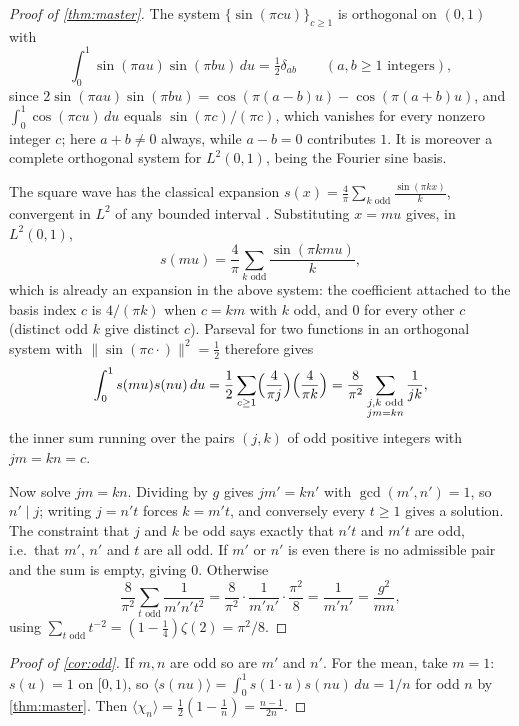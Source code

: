 \documentclass[11pt]{amsart}
\theoremstyle{definition}
\theoremstyle{remark}
\begin{document}
\begin{proof}[Proof of \cref{thm:master}]
The system $\{\sin(\pi c u)\}_{c\ge1}$ is orthogonal on $(0,1)$ with
\[
\int_0^1\sin(\pi a u)\sin(\pi b u)\,du=\tfrac12\delta_{ab}\qquad(a,b\ge1\text{ integers}),
\]
since $2\sin(\pi au)\sin(\pi bu)=\cos(\pi(a-b)u)-\cos(\pi(a+b)u)$, and $\int_0^1\cos(\pi cu)\,du$ equals $\sin(\pi c)/(\pi c)$, which vanishes for every nonzero integer $c$; here $a+b\ne0$ always, while $a-b=0$ contributes $1$. It is moreover a complete orthogonal system for $L^2(0,1)$, being the Fourier sine basis.

The square wave has the classical expansion $s(x)=\frac4\pi\sum_{k\text{ odd}}\frac{\sin(\pi kx)}{k}$, convergent in $L^2$ of any bounded interval \cite{steinshakarchi}. Substituting $x=mu$ gives, in $L^2(0,1)$,
\[
s(mu)=\frac4\pi\sum_{k\text{ odd}}\frac{\sin(\pi k m u)}{k},
\]
which is already an expansion in the above system: the coefficient attached to the basis index $c$ is $4/(\pi k)$ when $c=km$ with $k$ odd, and $0$ for every other $c$ (distinct odd $k$ give distinct $c$). Parseval for two functions in an orthogonal system with $\|\sin(\pi c\cdot)\|^2=\tfrac12$ therefore gives
\[
\int_0^1 s(mu)s(nu)\,du=\frac12\sum_{c\ge1}\Bigl(\frac4{\pi j}\Bigr)\Bigl(\frac4{\pi k}\Bigr)
=\frac{8}{\pi^2}\sum_{\substack{j,k\text{ odd}\\ jm=kn}}\frac1{jk},
\]
the inner sum running over the pairs $(j,k)$ of odd positive integers with $jm=kn=c$.

Now solve $jm=kn$. Dividing by $g$ gives $jm'=kn'$ with $\gcd(m',n')=1$, so $n'\mid j$; writing $j=n't$ forces $k=m't$, and conversely every $t\ge1$ gives a solution. The constraint that $j$ and $k$ be odd says exactly that $n't$ and $m't$ are odd, i.e.\ that $m'$, $n'$ and $t$ are all odd. If $m'$ or $n'$ is even there is no admissible pair and the sum is empty, giving $0$. Otherwise
\[
\frac{8}{\pi^2}\sum_{t\text{ odd}}\frac{1}{m'n't^2}=\frac{8}{\pi^2}\cdot\frac{1}{m'n'}\cdot\frac{\pi^2}{8}=\frac{1}{m'n'}=\frac{g^2}{mn},
\]
using $\sum_{t\text{ odd}}t^{-2}=(1-\tfrac14)\zeta(2)=\pi^2/8$.
\end{proof}

\begin{proof}[Proof of \cref{cor:odd}]
If $m,n$ are odd so are $m'$ and $n'$. For the mean, take $m=1$: $s(u)=1$ on $[0,1)$, so $\langle s(nu)\rangle=\int_0^1 s(1\cdot u)s(nu)\,du=1/n$ for odd $n$ by \cref{thm:master}. Then $\langle\chi_n\rangle=\tfrac12(1-\tfrac1n)=\frac{n-1}{2n}$.
\end{proof}
\end{document}

